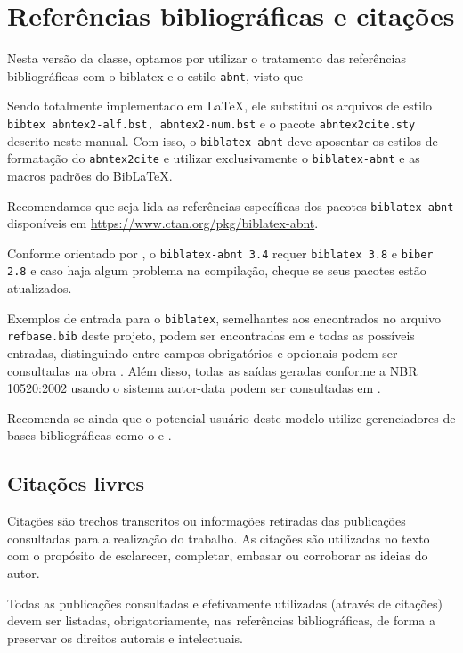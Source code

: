 \section{Referências bibliográficas e citações}

Nesta versão da classe, optamos por utilizar o tratamento das referências bibliográficas com o {\ttfamily biblatex} e o estilo \texttt{abnt}, visto que
\begin{citacao}
Sendo totalmente implementado em \LaTeX, ele substitui os arquivos de estilo \verb|bibtex abntex2-alf.bst, abntex2-num.bst| e o pacote \verb|abntex2cite.sty| descrito neste manual. Com isso, o \verb|biblatex-abnt| deve aposentar os estilos de formatação do \verb|abntex2cite| e utilizar exclusivamente o \verb|biblatex-abnt| e as macros padrões do Bib\LaTeX. \cite{araujopacote}
\end{citacao}

Recomendamos que seja lida as referências específicas dos pacotes \verb|biblatex-abnt| disponíveis em \url{https://www.ctan.org/pkg/biblatex-abnt}.

Conforme orientado por \textcite{marquesbiblatex}, o \verb|biblatex-abnt 3.4| requer \verb|biblatex 3.8| e \verb|biber 2.8| e caso haja algum problema na compilação, cheque se seus pacotes estão atualizados.

Exemplos de entrada para o \verb|biblatex|, semelhantes aos encontrados no arquivo \verb|refbase.bib| deste projeto, podem ser encontradas em \textcite{marquesbiblatex} e todas as possíveis entradas, distinguindo entre campos obrigatórios e opcionais podem ser consultadas na obra . Além disso, todas as saídas geradas conforme a NBR 10520:2002 usando o sistema autor-data podem ser consultadas em \textcite{marquesexemplos}.

Recomenda-se ainda que o potencial usuário deste modelo utilize gerenciadores de bases bibliográficas como o \textcite{Zotero} e \textcite{JabRef2009}.

\subsection{Citações livres}\label{citacoesLivres}
Citações são trechos transcritos ou informações retiradas das publicações consultadas para a realização do trabalho.
As citações são utilizadas no texto com o propósito de esclarecer, completar, embasar ou corroborar as ideias do autor.

Todas as publicações consultadas e efetivamente utilizadas (através de citações) devem ser listadas, obrigatoriamente, nas referências bibliográficas, de forma a preservar os direitos autorais e intelectuais.


